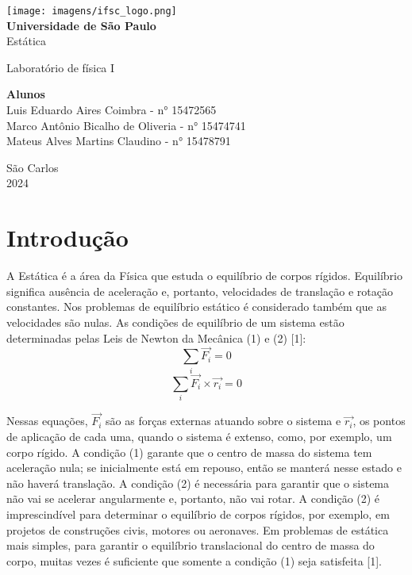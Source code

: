 \documentclass[12pt, letterpaper]{article}
\begin{document}
\begin{titlepage}
    \begin{center}
        \Large
        \vspace*{1cm}

        \texttt{[image: imagens/ifsc\_logo.png]} \\
        \Huge
        \textbf{Universidade de São Paulo} \\
        \huge
        Estática
        
        \Large
        Laboratório de física I
        \vspace{4cm}
        \Large
        
    \end{center}
    
    \begin{flushright}
        \Large
        \textbf{Alunos}\\
        \large
            Luis Eduardo Aires Coimbra - n° 15472565\\
            Marco Antônio Bicalho de Oliveria - n° 15474741\\
            Mateus Alves Martins Claudino - n° 15478791
    \end{flushright}
    
    \vspace*{\fill}
    \centering \large São Carlos \\ 2024
    
\end{titlepage}
 \tableofcontents
 \newpage

\section{Introdução}
A Estática é a área da Física que estuda o equilíbrio de corpos rígidos. Equilíbrio significa ausência de aceleração e, portanto, velocidades de translação e rotação constantes. Nos problemas de equilíbrio estático é considerado também que as velocidades são nulas. As condições de equilíbrio de um sistema estão determinadas pelas Leis de Newton da Mecânica (1) e (2) [1]: 
\begin{equation}
\sum\limits_{i}^{\mbox{}}\vec{F_i} = 0
\end{equation}
\begin{equation}
\sum\limits_{i}^{\mbox{}}\vec{F_i}\times\vec{r_i} = 0
\end{equation}


Nessas equações, $\vec{F_i}$ são as forças externas atuando sobre o sistema e
$\vec{r_i}$, os pontos de aplicação de cada uma, quando o sistema é extenso, como,
por exemplo, um corpo rígido.
A condição (1) garante que o centro de massa
do sistema tem aceleração nula; se inicialmente está em repouso, então se
manterá nesse estado e não haverá translação. A condição (2) é necessária
para garantir que o sistema não vai se acelerar angularmente e, portanto, não
vai rotar. A condição (2) é imprescindível para determinar o equilíbrio de corpos
rígidos, por exemplo, em projetos de construções civis, motores ou aeronaves.
Em problemas de estática mais simples, para garantir o equilíbrio translacional
do centro de massa do corpo, muitas vezes é suficiente que somente a
condição (1) seja satisfeita [1].
\end{document}
